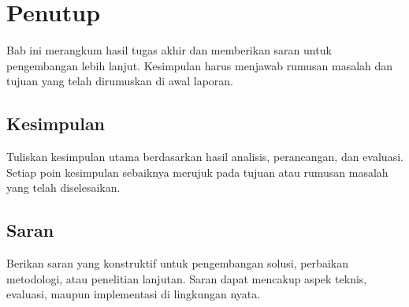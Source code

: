 %
%
%
%
%

\chapter{Penutup}

Bab ini merangkum hasil tugas akhir dan memberikan saran untuk
pengembangan lebih lanjut. Kesimpulan harus menjawab rumusan masalah
dan tujuan yang telah dirumuskan di awal laporan.

\section{Kesimpulan}

Tuliskan kesimpulan utama berdasarkan hasil analisis, perancangan,
dan evaluasi. Setiap poin kesimpulan sebaiknya merujuk pada tujuan
atau rumusan masalah yang telah diselesaikan.

\blindtext

\section{Saran}

Berikan saran yang konstruktif untuk pengembangan solusi, perbaikan
metodologi, atau penelitian lanjutan. Saran dapat mencakup aspek
teknis, evaluasi, maupun implementasi di lingkungan nyata.

\blindtext
